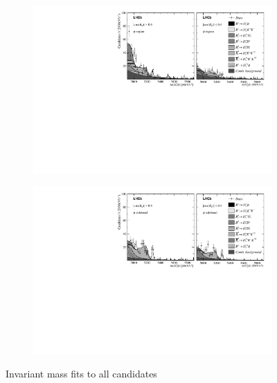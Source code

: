 \begin{figure}[!h]
\begin{subfigure}[t]{1.0\textwidth}
        \includegraphics[width=1.0\textwidth]{figs/Appendix_FitCategories/canvas_DsPhi_merged_both_summed_splitHel_splitKKPi_s21_s21r1_s24_s26.pdf}\\
    \end{subfigure}
    \begin{subfigure}[t]{1.0\textwidth}
        \centering
        \includegraphics[width=1.0\textwidth]{figs/Appendix_FitCategories/canvas_DsPhiSide_merged_both_summed_splitHel_splitKKPi_s21_s21r1_s24_s26.pdf}\\
    \end{subfigure}
    \caption{Invariant mass fits to all \decay{\Bp}{\Dsp\phiz} candidates}
    \label{fig:app_fit_all}
\end{figure}




